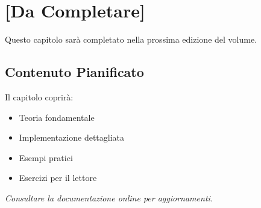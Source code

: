 \chapter{[Da Completare]}

Questo capitolo sarà completato nella prossima edizione del volume.

\section{Contenuto Pianificato}

Il capitolo coprirà:
\begin{itemize}
\item Teoria fondamentale
\item Implementazione dettagliata
\item Esempi pratici
\item Esercizi per il lettore
\end{itemize}

\textit{Consultare la documentazione online per aggiornamenti.}
